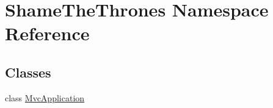\hypertarget{namespace_shame_the_thrones}{}\section{Shame\+The\+Thrones Namespace Reference}
\label{namespace_shame_the_thrones}
\subsection*{Classes}
\begin{DoxyCompactItemize}
\item 
class \hyperlink{class_shame_the_thrones_1_1_mvc_application}{Mvc\+Application}
\end{DoxyCompactItemize}
